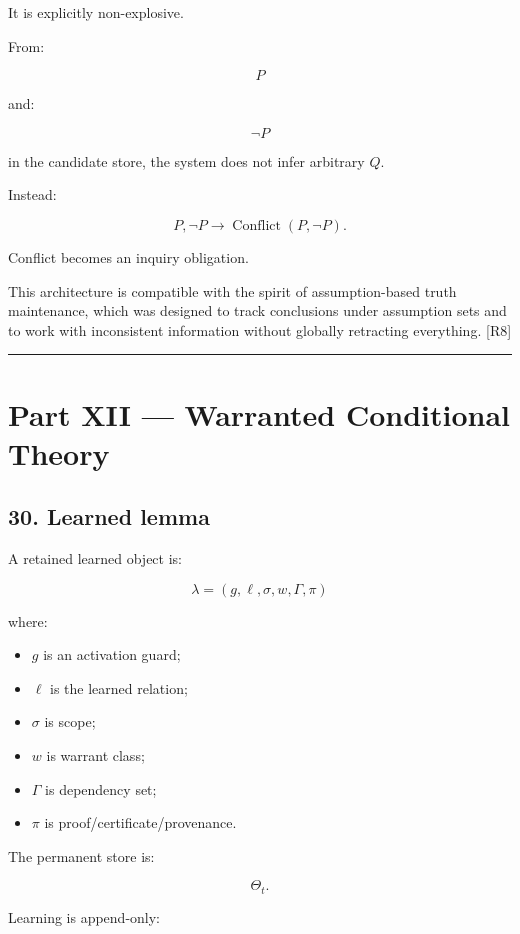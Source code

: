 \documentclass[
]{article}
\providecommand{\tightlist}{%
  \setlength{\itemsep}{0pt}\setlength{\parskip}{0pt}}
\begin{document}
It is explicitly non-explosive.

From:

\[
P
\]

and:

\[
\neg P
\]

in the candidate store, the system does not infer arbitrary \(Q\).

Instead:

\[
\boxed{
P,\neg P
\to
\operatorname{Conflict}(P,\neg P).
}
\]

Conflict becomes an inquiry obligation.

This architecture is compatible with the spirit of assumption-based
truth maintenance, which was designed to track conclusions under
assumption sets and to work with inconsistent information without
globally retracting everything. {[}R8{]}

\begin{center}\rule{0.5\linewidth}{0.5pt}\end{center}

\section{Part XII --- Warranted Conditional
Theory}\label{part-xii-warranted-conditional-theory}

\subsection{30. Learned lemma}\label{learned-lemma}

A retained learned object is:

\[
\boxed{
\lambda
=
(g,\ell,\sigma,w,\Gamma,\pi)
}
\]

where:

\begin{itemize}
\tightlist
\item
  \(g\) is an activation guard;
\item
  \(\ell\) is the learned relation;
\item
  \(\sigma\) is scope;
\item
  \(w\) is warrant class;
\item
  \(\Gamma\) is dependency set;
\item
  \(\pi\) is proof/certificate/provenance.
\end{itemize}

The permanent store is:

\[
\boxed{
\Theta_t.
}
\]

Learning is append-only:
\end{document}
